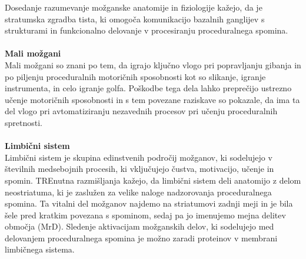 \documentclass[10pt,a4paper]{article}
\begin{document}
Dosedanje razumevanje možganske anatomije in fiziologije kažejo, da je stratumska zgradba tista, ki omogoča komunikacijo bazalnih ganglijev s strukturami in funkcionalno delovanje v procesiranju proceduralnega spomina. 
\\
\\
\textbf{Mali možgani}\\
Mali možgani so znani po tem, da igrajo ključno vlogo pri popravljanju gibanja in po piljenju proceduralnih motoričnih sposobnosti kot so slikanje, igranje instrumenta, in celo igranje golfa. Poškodbe tega dela lahko preprečijo ustrezno učenje motoričnih sposobnosti in s tem povezane raziskave so pokazale, da ima ta del vlogo pri avtomatiziranju nezavednih procesov pri učenju proceduralnih spretnosti.
\\
\\ 
\textbf{Limbični sistem}\\
Limbični sistem je skupina edinstvenih področij možganov, ki sodelujejo v številnih medsebojnih procesih, ki vključujejo čustva, motivacijo, učenje in spomin. TREnutna razmišljanja kažejo, da limbični sistem deli anatomijo z delom neostriatuma, ki je zaslužen za velike naloge nadzorovanja proceduralnega spomina. Ta vitalni del možganov najdemo na striatumovi zadnji meji in je bila šele pred kratkim povezana s spominom, sedaj pa jo imenujemo mejna delitev območja (MrD). Sledenje aktivacijam možganskih delov, ki sodelujejo med delovanjem proceduralnega spomina je možno zaradi proteinov v membrani limbičnega sistema.
\end{document}
